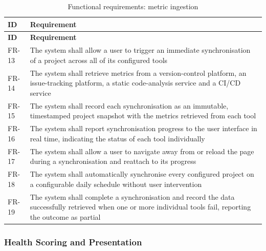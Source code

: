 \begin{longtable}{
  >{\raggedright\arraybackslash}p{}
  >{\raggedright\arraybackslash}p{}
}
\caption{Functional requirements: metric ingestion}
\label{tab:fr-ingestion}\\
\toprule
\textbf{ID} & \textbf{Requirement} \\
\midrule
\endfirsthead
\toprule
\textbf{ID} & \textbf{Requirement} \\
\midrule
\endhead
\bottomrule
\endlastfoot
FR-13 & The system shall allow a user to trigger an immediate synchronisation of a
project across all of its configured tools \\
\addlinespace
FR-14 & The system shall retrieve metrics from a version-control platform, an
issue-tracking platform, a static code-analysis service and a CI/CD
service \\
\addlinespace
FR-15 & The system shall record each synchronisation as an immutable, timestamped
project snapshot with the metrics retrieved from each tool \\
\addlinespace
FR-16 & The system shall report synchronisation progress to the user interface in
real time, indicating the status of each tool individually \\
\addlinespace
FR-17 & The system shall allow a user to navigate away from or reload the page during
a synchronisation and reattach to its progress \\
\addlinespace
FR-18 & The system shall automatically synchronise every configured project on a
configurable daily schedule without user intervention \\
\addlinespace
FR-19 & The system shall complete a synchronisation and record the data successfully
retrieved when one or more individual tools fail, reporting the outcome as partial \\
\end{longtable}

\subsubsection{Health Scoring and Presentation}

